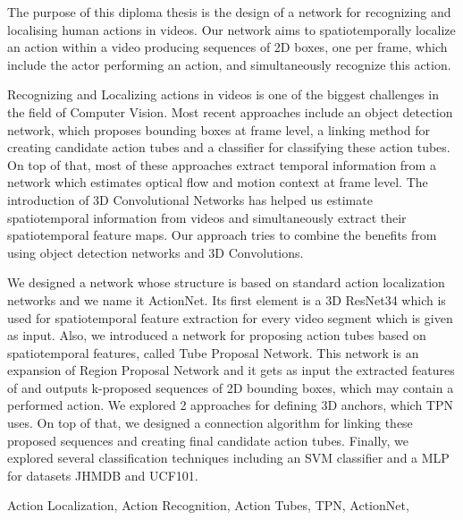 \documentclass[10pt, twoside, a4paper]{cvsp-thesis}
\newcommand{\en}{\selectlanguage{english}}
\begin{document}
\en
\begin{abstracteng}

  The purpose of this diploma thesis is the design of a network for recognizing and localising human actions in videos.
  Our network aims to spatiotemporally localize an  action within a video
  producing sequences of 2D boxes, one per frame, which include the actor
  performing an action, and simultaneously recognize this action. \par

  Recognizing and Localizing  actions in videos is one of the biggest
  challenges in the field of Computer Vision. Most recent approaches
  include an object detection network, which proposes bounding boxes at frame level,
  a linking method for creating candidate action tubes and
  a classifier for classifying these action tubes. On top of that, most of these
  approaches extract temporal information from a network which
  estimates optical flow and motion context at frame level. The introduction of 3D
  Convolutional Networks has helped us estimate spatiotemporal
  information from videos and simultaneously extract their spatiotemporal
  feature maps. Our approach tries to combine the benefits from using
  object detection networks and 3D Convolutions.\par

  We designed a network whose structure is based on standard action localization networks and we name it ActionNet. Its first
  element is a 3D ResNet34 which is used for spatiotemporal feature extraction for every video segment which is given as input.
  Also,   we introduced a network for proposing action tubes based on spatiotemporal features, called Tube Proposal Network.
  This network is an  expansion of Region Proposal Network and it gets as input the extracted features of and
  outputs k-proposed sequences of 2D bounding boxes, which may contain a performed action.
  We explored 2 approaches for  defining 3D anchors, which TPN uses. On top of that,   we designed a connection algorithm for
  linking these  proposed sequences and creating final candidate action tubes. Finally, we explored several classification techniques
  including an SVM classifier and a MLP for datasets JHMDB and UCF101.

\begin{keywordseng}
Action Localization, Action Recognition, Action Tubes, TPN, ActionNet,
\end{keywordseng}

\end{abstracteng}
\end{document}

